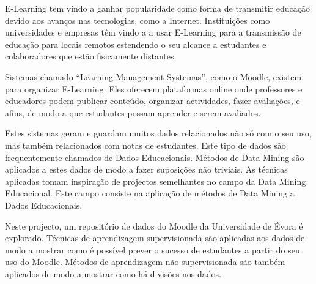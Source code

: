 \begin{tueSUMARIO}

E-Learning tem vindo a ganhar popularidade como forma de transmitir educação
devido aos avanços nas tecnologias, como a Internet. Instituições como
universidades e empresas têm vindo a a usar E-Learning para a transmissão de
educação para locais remotos estendendo o seu alcance a estudantes e
colaboradores que estão fisicamente distantes.

Sistemas chamado ``Learning Management Systemas'', como o Moodle, existem para
organizar E-Learning. Eles oferecem plataformas online onde professores e
educadores podem publicar conteúdo, organizar actividades, fazer avaliações, e
afins, de modo a que estudantes possam aprender e serem avaliados.

Estes sistemas geram e guardam muitos dados relacionados não só com o seu uso,
mas também relacionados com notas de estudantes. Este tipo de dados são
frequentemente chamados de Dados Educacionais. Métodos de Data Mining são
aplicados a estes dados de modo a fazer suposições não triviais. As técnicas
aplicadas tomam inspiração de projectos semelhantes no campo da Data Mining
Educacional. Este campo consiste na aplicação de métodos de Data Mining a Dados
Educacionais.

Neste projecto, um repositório de dados do Moodle da Universidade de Évora é
explorado. Técnicas de aprendizagem supervisionada são aplicadas aos dados de
modo a mostrar como é possível prever o sucesso de estudantes a partir do seu
uso do Moodle. Métodos de aprendizagem não supervisionada são também aplicados
de modo a mostrar como há divisões nos dados.

\end{tueSUMARIO}
